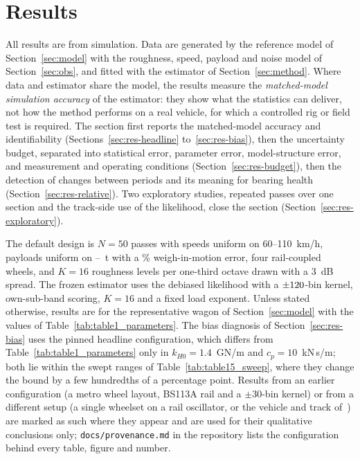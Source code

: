 \section{Results}\label{sec:results}

All results are from simulation. Data are generated by the reference model of Section~\ref{sec:model}
with the roughness, speed, payload and noise model of Section~\ref{sec:obs}, and fitted with the
estimator of Section~\ref{sec:method}. Where data and estimator share the model, the results measure the
\emph{matched-model simulation accuracy} of the estimator: they show what the statistics can deliver, not
how the method performs on a real vehicle, for which a controlled rig or field test is required. The
section first reports the matched-model accuracy and identifiability (Sections~\ref{sec:res-headline}
to~\ref{sec:res-bias}), then the uncertainty budget, separated into statistical error, parameter error,
model-structure error, and measurement and operating conditions (Section~\ref{sec:res-budget}), then the
detection of changes between periods and its meaning for bearing health (Section~\ref{sec:res-relative}).
Two exploratory studies, repeated passes over one section and the track-side use of the likelihood,
close the section (Section~\ref{sec:res-exploratory}).

The default design is $N=50$ passes with speeds uniform on 60--110~km/h, payloads uniform on
\PayloadMin--\PayloadMax~t with a \WIMsigmaPct\% weigh-in-motion error, four rail-coupled wheels, and
$K=16$ roughness levels per one-third octave drawn with a 3~dB spread. The frozen estimator uses the
debiased likelihood with a $\pm120$-bin kernel, own-sub-band scoring, $K=16$ and a fixed load
exponent. Unless stated otherwise, results are for the representative wagon of Section~\ref{sec:model}
with the values of Table~\ref{tab:table1_parameters}. The bias diagnosis of Section~\ref{sec:res-bias}
uses the pinned headline configuration, which differs from Table~\ref{tab:table1_parameters} only in
$k_{H0} = 1.4$~GN/m and $c_p = 10$~kN\,s/m; both lie within the swept ranges of Table~\ref{tab:table15_sweep}, where they change
the bound by a few hundredths of a percentage point. Results from an earlier configuration (a metro wheel
layout, BS113A rail and a $\pm30$-bin kernel) or from a different setup (a single wheelset on a rail
oscillator, or the vehicle and track of~\citep{carrigan2023}) are marked as such where they appear and are
used for their qualitative conclusions only; \texttt{docs/provenance.md} in the repository lists the
configuration behind every table, figure and number.

